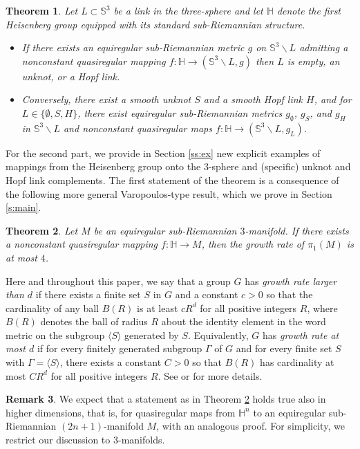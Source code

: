 \documentclass[10pt,letterpaper]{amsart}
\newtheorem{thm}{Theorem}
\theoremstyle{definition}
\newtheorem{remark}[thm]{Remark}
\numberwithin{thm}{subsection}
\numberwithin{equation}{section}
\begin{document}
\begin{thm}
\label{thm:linkOurs} Let $L\subset {\mathbb S}^3$ be a link in the
three-sphere and let ${\mathbb H}$ denote the first Heisenberg group
equipped with its standard sub-Riemannian structure.
\begin{itemize}
\item If there
exists an equiregular sub-Riemannian metric $g$ on
${\mathbb S}^3\backslash L$ admitting a nonconstant quasiregular mapping
$f: {\mathbb H} \rightarrow ({\mathbb S}^3\backslash L, g)$ then $L$
is empty, an unknot, or a Hopf link.
\item Conversely, there exist a smooth unknot $S$ and a smooth Hopf link $H$, and for $L \in \{\emptyset, S, H\}$, there exist equiregular sub-Riemannian metrics $g_\emptyset$, $g_S$, and $g_H$ in ${\mathbb S}^3\backslash L$ and nonconstant quasiregular maps $f: {\mathbb H} \rightarrow ({\mathbb S}^3\backslash L, g_L)$.
\end{itemize}
\end{thm}

For the second part, we provide in Section
\ref{ss:ex} new explicit examples of mappings from the Heisenberg
group onto the $3$-sphere and (specific) unknot and Hopf link
complements. The first statement of the theorem is a consequence of the
following more general Varopoulos-type result, which we prove in
Section \ref{s:main}.

\begin{thm}
\label{thm:main} Let $M$ be an equiregular sub-Riemannian
$3$-manifold. If there exists a nonconstant quasiregular mapping
$f: {\mathbb H} \rightarrow M$, then the growth rate of $\pi_1(M)$ is at
most $4$.
\end{thm}

Here and throughout this paper, we say that a group $G$ has {\it growth rate larger than $d$} if there exists a finite set $S$ in $G$ and a constant $c>0$ so that the cardinality of any ball $B(R)$ is at least $cR^d$ for all positive integers $R$, where $B(R)$ denotes the ball of radius $R$ about the identity element in the word metric on the subgroup $\langle S\rangle$ generated by $S$. Equivalently, $G$ has {\it growth rate at most $d$} if for every finitely generated subgroup $\Gamma$ of $G$ and for every finite set $S$ with $\Gamma = \langle S\rangle$, there exists a constant $C>0$ so that $B(R)$ has cardinality at most $CR^d$ for all positive integers $R$. See \cite{MR2832708} or \cite[\S5B]{MR2307192} for more details.

\begin{remark}
We expect that a statement as in Theorem \ref{thm:main} holds true also in higher dimensions, that is, for quasiregular maps from ${\mathbb H}^n$ to an equiregular sub-Riemannian $(2n+1)$-manifold $M$, with an analogous proof. For simplicity, we restrict our discussion to $3$-manifolds.
\end{remark}
\end{document}
